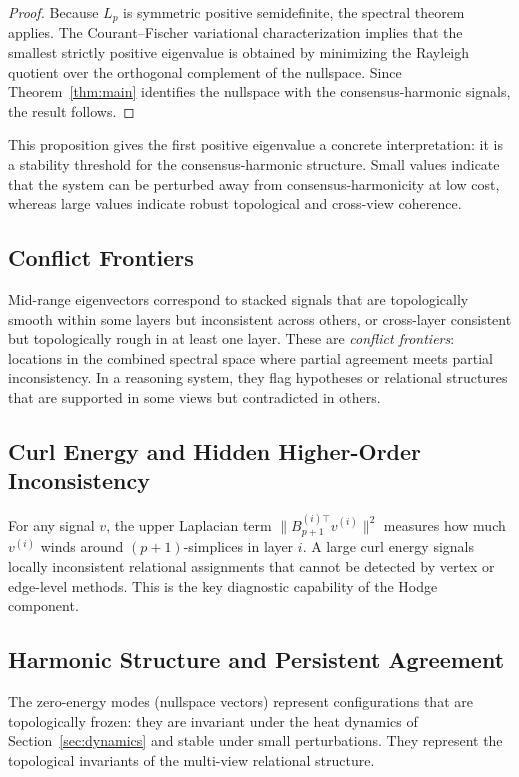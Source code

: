 \documentclass[11pt]{article}
\theoremstyle{definition}
\theoremstyle{remark}
\begin{document}
\begin{proof}
Because $L_p$ is symmetric positive semidefinite, the spectral theorem applies. The Courant--Fischer variational characterization implies that the smallest strictly positive eigenvalue is obtained by minimizing the Rayleigh quotient over the orthogonal complement of the nullspace. Since Theorem~\ref{thm:main} identifies the nullspace with the consensus-harmonic signals, the result follows.
\end{proof}

This proposition gives the first positive eigenvalue a concrete interpretation: it is a stability threshold for the consensus-harmonic structure. Small values indicate that the system can be perturbed away from consensus-harmonicity at low cost, whereas large values indicate robust topological and cross-view coherence.

\subsection{Conflict Frontiers}

Mid-range eigenvectors correspond to stacked signals that are topologically
smooth within some layers but inconsistent across others, or cross-layer
consistent but topologically rough in at least one layer. These are
\emph{conflict frontiers}: locations in the combined spectral space where
partial agreement meets partial inconsistency. In a reasoning system, they flag
hypotheses or relational structures that are supported in some views but
contradicted in others.

\subsection{Curl Energy and Hidden Higher-Order Inconsistency}

For any signal $v$, the upper Laplacian term $\|B_{p+1}^{(i)\top}v^{(i)}\|^2$
measures how much $v^{(i)}$ winds around $(p+1)$-simplices in layer $i$. A
large curl energy signals locally inconsistent relational assignments that
cannot be detected by vertex or edge-level methods. This is the key diagnostic
capability of the Hodge component.

\subsection{Harmonic Structure and Persistent Agreement}

The zero-energy modes (nullspace vectors) represent configurations that are
topologically frozen: they are invariant under the heat dynamics of
Section~\ref{sec:dynamics} and stable under small perturbations. They represent
the topological invariants of the multi-view relational structure.
\end{document}
